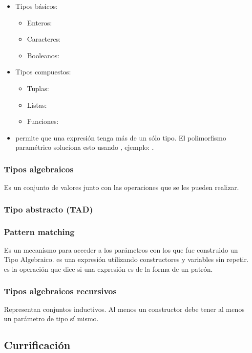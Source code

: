 \begin{itemize}
  \item Tipos básicos:
    \begin{itemize}
      \item Enteros: 
      \item Caracteres: 
      \item Booleanos: 
    \end{itemize}
  \item Tipos compuestos:
    \begin{itemize}
      \item Tuplas: 
      \item Listas: \xtt{[A]}
      \item Funciones: 
    \end{itemize}
  \item {} permite que una expresión tenga más de un sólo tipo. El polimorfismo paramétrico soluciona esto usando , ejemplo: .
\end{itemize}

\subsubsection{Tipos algebraicos} Es un conjunto de valores junto con las operaciones que se les pueden realizar.

\subsubsection{Tipo abstracto (TAD)}

\subsubsection{Pattern matching} Es un mecanismo para acceder a los parámetros con los que fue construido un Tipo Algebraico.  es una expresión utilizando constructores y variables sin repetir.  es la operación que dice si una expresión es de la forma de un patrón.

\subsubsection{Tipos algebraicos recursivos} Representan conjuntos inductivos. Al menos un constructor debe tener al menos un parámetro de tipo sí mismo.

\subsection{Currificación}

